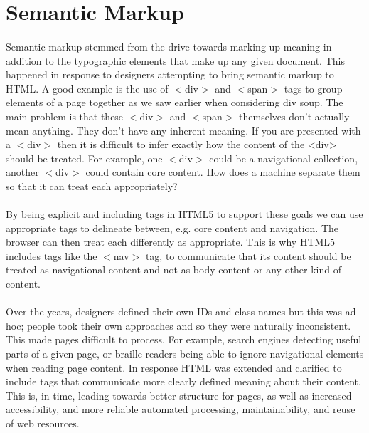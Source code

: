 \section{Semantic Markup}
\paragraph{} Semantic markup stemmed from the drive towards marking up meaning in addition to the typographic elements that make up any given document. This happened in response to designers attempting to bring semantic markup to HTML. A good example is the use of $<$div$>$ and $<$span$>$ tags to group elements of a page together as we saw earlier when considering div soup. The main problem is that these $<$div$>$ and $<$span$>$ themselves don’t actually mean anything. They don't have any inherent meaning. If you are presented with a $<$div$>$ then it is difficult to infer exactly how the content of the <div> should be treated. For example, one $<$div$>$ could be a navigational collection, another $<$div$>$ could contain core content. How does a machine separate them so that it can treat each appropriately? 
\paragraph{} By being explicit and including tags in HTML5 to support these goals we can use appropriate tags to delineate between, e.g. core content and navigation. The browser can then treat each differently as appropriate. This is why HTML5 includes tags like the  $<$nav$>$ tag, to communicate that its content should be treated as navigational content and not as body content or any other kind of content. 
\paragraph{} Over the years, designers defined their own IDs and class names but this was ad hoc; people took their own approaches and so they were naturally inconsistent. This made pages difficult to process. For example, search engines detecting useful parts of a given page, or braille readers being able to ignore navigational elements when reading page content. In response HTML was extended and clarified to include tags that communicate more clearly defined meaning about their content. This is, in time, leading towards better structure for pages, as well as increased accessibility, and more reliable automated processing, maintainability, and reuse of web resources. 

